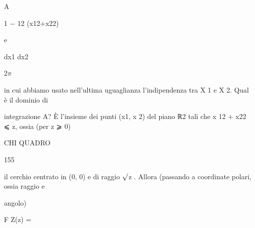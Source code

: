 \documentclass[a4paper,portrait,12pt]{article}
\begin{document}
\begin{flushleft}
A
\end{flushleft}





\begin{flushleft}
1 $-$ 12 (x12+x22)
\end{flushleft}


\begin{flushleft}
e
\end{flushleft}


\begin{flushleft}
dx1 dx2
\end{flushleft}


\begin{flushleft}
2$\pi$
\end{flushleft}





\begin{flushleft}
in cui abbiamo usato nell'ultima uguaglianza l'indipendenza tra X 1 e X 2. Qual \`{e} il dominio di
\end{flushleft}


\begin{flushleft}
integrazione A? \`{E} l'insieme dei punti (x1, x 2) del piano ℝ2 tali che x 12 + x22 ⩽ z, ossia (per z ⩾ 0)
\end{flushleft}





\begin{flushleft}
 CHI QUADRO
\end{flushleft}





155





\begin{flushleft}
il cerchio centrato in (0, 0) e di raggio $\surd$z . Allora (passando a coordinate polari, ossia raggio e
\end{flushleft}


\begin{flushleft}
angolo)
\end{flushleft}


\begin{flushleft}
F Z(z) =
\end{flushleft}
\end{document}
